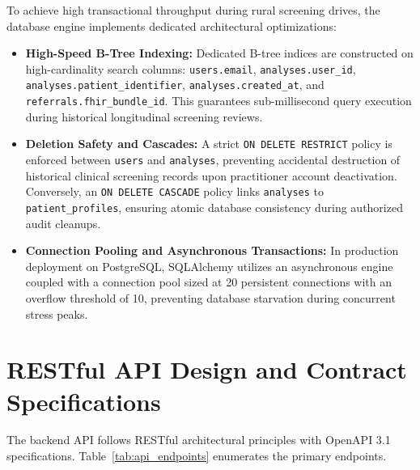 \documentclass[12pt,a4paper,oneside]{report}
\begin{document}
To achieve high transactional throughput during rural screening drives, the database engine implements dedicated architectural optimizations:
\begin{itemize}
    \item \textbf{High-Speed B-Tree Indexing:} Dedicated B-tree indices are constructed on high-cardinality search columns: \texttt{users.email}, \texttt{analyses.user\_id}, \texttt{analyses.patient\_identifier}, \texttt{analyses.created\_at}, and \texttt{referrals.fhir\_bundle\_id}. This guarantees sub-millisecond query execution during historical longitudinal screening reviews.
    \item \textbf{Deletion Safety and Cascades:} A strict \texttt{ON DELETE RESTRICT} policy is enforced between \texttt{users} and \texttt{analyses}, preventing accidental destruction of historical clinical screening records upon practitioner account deactivation. Conversely, an \texttt{ON DELETE CASCADE} policy links \texttt{analyses} to \texttt{patient\_profiles}, ensuring atomic database consistency during authorized audit cleanups.
    \item \textbf{Connection Pooling and Asynchronous Transactions:} In production deployment on PostgreSQL, SQLAlchemy utilizes an asynchronous engine coupled with a connection pool sized at 20 persistent connections with an overflow threshold of 10, preventing database starvation during concurrent stress peaks.
\end{itemize}

\section{RESTful API Design and Contract Specifications}
\label{sec:api_design}

The backend API follows RESTful architectural principles with OpenAPI 3.1 specifications. Table~\ref{tab:api_endpoints} enumerates the primary endpoints.
\end{document}
